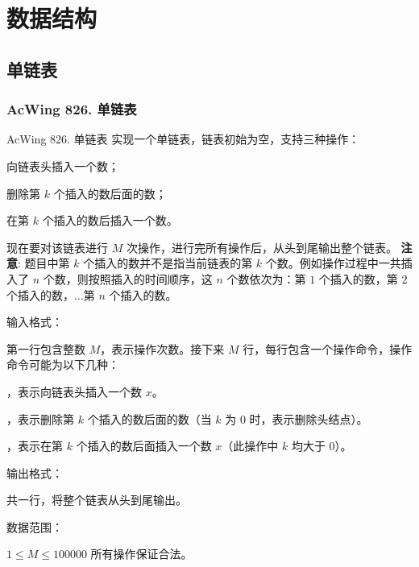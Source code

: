 \chapter{数据结构}


\section{单链表}

\subsection{AcWing 826. 单链表}

\begin{titledbox}{AcWing 826. 单链表}
    实现一个单链表，链表初始为空，支持三种操作：
    \begin{myenum}
        \item 向链表头插入一个数；
        \item 删除第 $k$ 个插入的数后面的数；
        \item 在第 $k$ 个插入的数后插入一个数。
    \end{myenum}

    现在要对该链表进行 $M$ 次操作，进行完所有操作后，从头到尾输出整个链表。
    \textbf{注意}: 题目中第 $k$ 个插入的数并不是指当前链表的第 $k$ 个数。例如操作过程中一共插入了 $n$ 个数，则按照插入的时间顺序，这 $n$ 个数依次为：第 $1$ 个插入的数，第 $2$ 个插入的数，$\dots$第 $n$ 个插入的数。

    输入格式：

    第一行包含整数 $M$，表示操作次数。接下来 $M$ 行，每行包含一个操作命令，操作命令可能为以下几种：

    \begin{myenum}
        \item {}，表示向链表头插入一个数 $x$。
        \item {}，表示删除第 $k$ 个插入的数后面的数（当 $k$ 为 $0$ 时，表示删除头结点）。
        \item {}，表示在第 $k$ 个插入的数后面插入一个数 $x$（此操作中 $k$ 均大于 $0$）。
    \end{myenum}

    输出格式：

    共一行，将整个链表从头到尾输出。

    数据范围：

    $1 \le M \le 100000$ 所有操作保证合法。


\end{titledbox}
